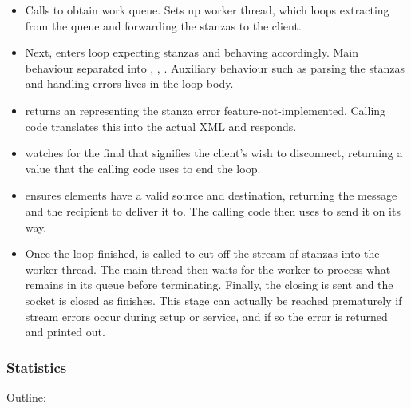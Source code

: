 \begin{itemize}
  \item Calls  to obtain work queue. Sets up worker thread, which loops extracting from the queue and forwarding the stanzas to the client.

  \item Next, enters loop expecting stanzas and behaving accordingly. Main behaviour separated into , , . Auxiliary behaviour such as parsing the stanzas and handling errors lives in the loop body.

  \item {} returns an  representing the stanza error feature-not-implemented. Calling code translates this into the actual XML and responds.

  \item {} watches for the final  that signifies the client's wish to disconnect, returning a value that the calling code uses to end the loop.

  \item {} ensures  elements have a valid source and destination, returning the message and the recipient to deliver it to. The calling code then uses  to send it on its way.

  \item Once the loop finished,  is called to cut off the stream of stanzas into the worker thread. The main thread then waits for the worker to process what remains in its queue before terminating. Finally, the closing  is sent and the socket is closed as  finishes. This stage can actually be reached prematurely if stream errors occur during setup or service, and if so the error is returned and printed out.
\end{itemize}

\subsubsection{Statistics}
Outline:

